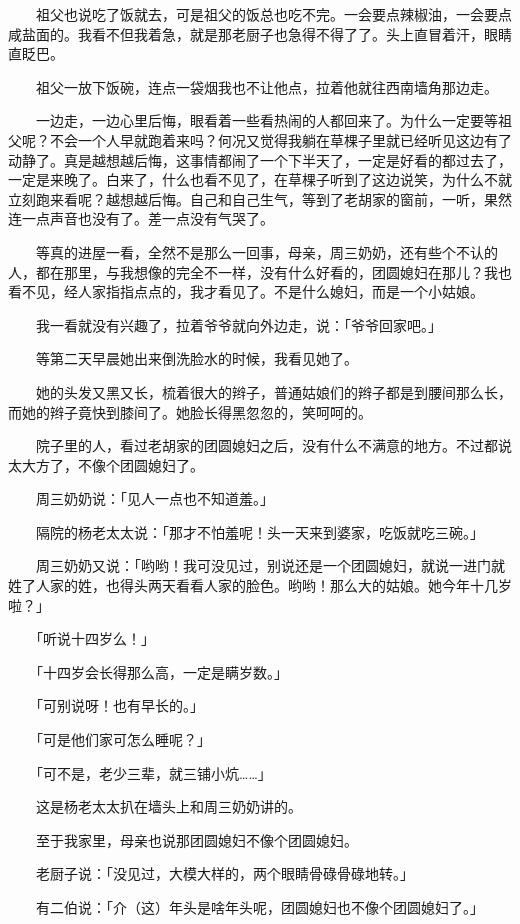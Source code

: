 \documentclass[UTF8]{ctexart}
\begin{document}
　　祖父也说吃了饭就去，可是祖父的饭总也吃不完。一会要点辣椒油，一会要点咸盐面的。我看不但我着急，就是那老厨子也急得不得了了。头上直冒着汗，眼睛直眨巴。

　　祖父一放下饭碗，连点一袋烟我也不让他点，拉着他就往西南墙角那边走。

　　一边走，一边心里后悔，眼看着一些看热闹的人都回来了。为什么一定要等祖父呢？不会一个人早就跑着来吗？何况又觉得我躺在草棵子里就已经听见这边有了动静了。真是越想越后悔，这事情都闹了一个下半天了，一定是好看的都过去了，一定是来晚了。白来了，什么也看不见了，在草棵子听到了这边说笑，为什么不就立刻跑来看呢？越想越后悔。自己和自己生气，等到了老胡家的窗前，一听，果然连一点声音也没有了。差一点没有气哭了。

　　等真的进屋一看，全然不是那么一回事，母亲，周三奶奶，还有些个不认的人，都在那里，与我想像的完全不一样，没有什么好看的，团圆媳妇在那儿？我也看不见，经人家指指点点的，我才看见了。不是什么媳妇，而是一个小姑娘。

　　我一看就没有兴趣了，拉着爷爷就向外边走，说：「爷爷回家吧。」

　　等第二天早晨她出来倒洗脸水的时候，我看见她了。

　　她的头发又黑又长，梳着很大的辫子，普通姑娘们的辫子都是到腰间那么长，而她的辫子竟快到膝间了。她脸长得黑忽忽的，笑呵呵的。

　　院子里的人，看过老胡家的团圆媳妇之后，没有什么不满意的地方。不过都说太大方了，不像个团圆媳妇了。

　　周三奶奶说：「见人一点也不知道羞。」

　　隔院的杨老太太说：「那才不怕羞呢！头一天来到婆家，吃饭就吃三碗。」

　　周三奶奶又说：「哟哟！我可没见过，别说还是一个团圆媳妇，就说一进门就姓了人家的姓，也得头两天看看人家的脸色。哟哟！那么大的姑娘。她今年十几岁啦？」

　　「听说十四岁么！」

　　「十四岁会长得那么高，一定是瞒岁数。」

　　「可别说呀！也有早长的。」

　　「可是他们家可怎么睡呢？」

　　「可不是，老少三辈，就三铺小炕……」

　　这是杨老太太扒在墙头上和周三奶奶讲的。

　　至于我家里，母亲也说那团圆媳妇不像个团圆媳妇。

　　老厨子说：「没见过，大模大样的，两个眼睛骨碌骨碌地转。」

　　有二伯说：「介（这）年头是啥年头呢，团圆媳妇也不像个团圆媳妇了。」
\end{document}
